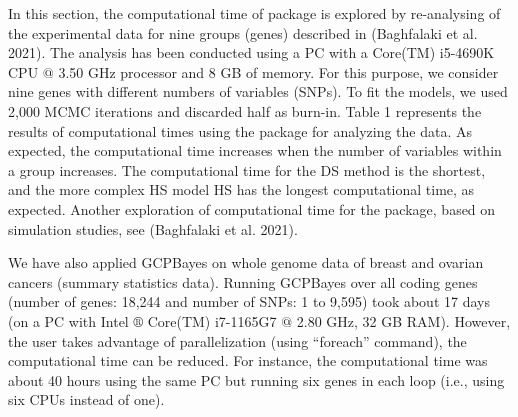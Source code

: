 In this section, the computational time of  package is explored
by re-analysing of the experimental data for nine groups (genes) described in (Baghfalaki et al. 2021).
The analysis has been conducted using a PC with a Core(TM) i5-4690K CPU \(@\) 3.50 GHz processor and 8 GB of memory. For this purpose, we consider nine genes with different numbers of variables (SNPs).
To fit the models, we used 2,000 MCMC iterations and discarded half as burn-in. Table 1 represents the results of computational times using the  package for analyzing the data. As expected, the computational time increases when the number of variables within a group increases. The computational time for the DS method is the shortest, and the more complex HS model HS has the longest computational time, as expected. Another exploration of computational time for the  package, based on simulation studies, see (Baghfalaki et al. 2021).

We have also applied GCPBayes on whole genome data of breast and ovarian cancers (summary statistics data). Running GCPBayes over all coding genes (number of genes: 18,244 and number of SNPs: 1 to 9,595) took about 17 days (on a PC with Intel \(®\) Core(TM) i7-1165G7 \(@\) 2.80 GHz, 32 GB RAM). However,
the user takes advantage of parallelization (using ``foreach'' command),
the computational time can be reduced. For instance, the computational time was about 40 hours using the same PC but running six genes in each loop (i.e., using six CPUs instead of one).

